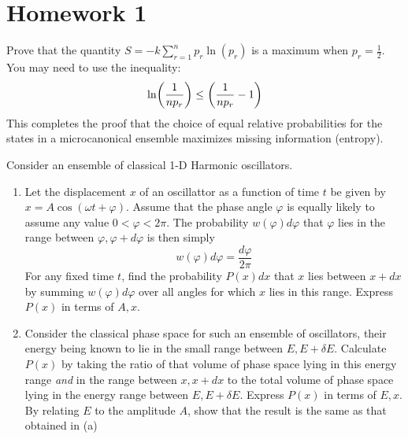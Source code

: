 \documentclass{article}
\date{Winter 2022}
\author{\EC}
\begin{document}
\maketitle
\tableofcontents
\newpage
\section{Homework 1}
    \begin{problem}
        Prove that the quantity $\displaystyle S=-k\sum_{r=1}^{n}p_r\ln(p_r)$ is a maximum when $p_r=\frac{1}{2}$. You may need to use the inequality: $$\ln(\oo{np_r})\leq\qty(\oo{np_r}-1)$$
        This completes the proof that the choice of equal relative probabilities for the states in a microcanonical ensemble maximizes missing information (entropy).
        \answerline
    \end{problem}\newpage
    \begin{problem}[Reif 2.3]
        Consider an ensemble of classical 1-D Harmonic oscillators. 
        \begin{enumerate}[label=(\alph*)]
            \item Let the displacement $x$ of an oscillattor as a function of time $t$ be given by $x=A\cos(\omega t+\varphi)$. Assume that the phase angle $\varphi$ is equally likely to assume any value $0<\varphi<2\pi$. The probability $w(\varphi)d\varphi$ that $\varphi$ lies in the range between $\varphi,\varphi+d\varphi$ is then simply $$w(\varphi)d\varphi=\frac{d\varphi}{2\pi}$$For any fixed time $t$, find the probability $P(x)dx$ that $x$ lies between $x+dx$ by summing $w(\varphi)d\varphi$ over all angles for which $x$ lies in this range. Express $P(x)$ in terms of $A,x$. 
            \item Consider the classical phase space for such an ensemble of oscillators, their energy being known to lie in the small range between $E,E+\delta E$. Calculate $P(x)$ by taking the ratio of that volume of phase space lying in this energy range \emph{and} in the range between $x,x+dx$ to the total volume of phase space lying in the energy range between $E,E+\delta E$. Express $P(x)$ in terms of $E,x$. By relating $E$ to the amplitude $A$, show that the result is the same as that obtained in (a)
        \end{enumerate}
        \answerline
    \end{problem}\newpage
\end{document}
